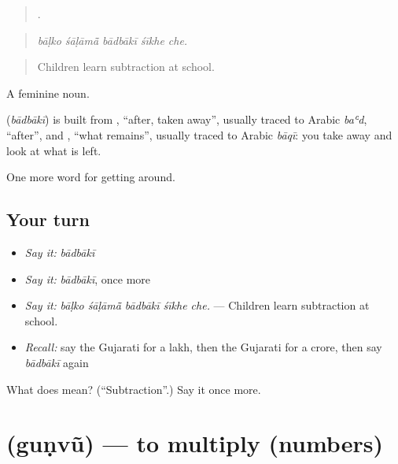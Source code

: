 \begin{quote}
    .
\end{quote}

\begin{quote}
\emph{bāḷko śāḷāmā̃ bādbākī śīkhe che.}
\end{quote}

\begin{quote}
Children learn subtraction at school.
\end{quote}

A feminine noun.

\begin{cousinweb}
\textbf{} (\emph{bādbākī}) is built from , \textquotedblleft{}after, taken away\textquotedblright{}, usually traced to Arabic \emph{baʿd}, \textquotedblleft{}after\textquotedblright{}, and , \textquotedblleft{}what remains\textquotedblright{}, usually traced to Arabic \emph{bāqī}: you take away and look at what is left.
\end{cousinweb}

\begin{grammarlens}[title={What you've built}]
One more word for getting around.
\end{grammarlens}

\subsection*{Your turn}
\begin{itemize}
\raggedright
  \item \emph{Say it:} \emph{bādbākī}
  \item \emph{Say it:} \emph{bādbākī}, once more
  \item \emph{Say it:} \emph{bāḷko śāḷāmā̃ bādbākī śīkhe che.} — Children learn subtraction at school.
  \item \emph{Recall:} say the Gujarati for a lakh, then the Gujarati for a crore, then say \emph{bādbākī} again
\end{itemize}

\begin{tcolorbox}[breakable,colback=teal!4,colframe=teal!35!black,title={Before you move on}]
What does  mean? (\textquotedblleft{}Subtraction\textquotedblright{}.) Say it once more.
\end{tcolorbox}
\section[\texorpdfstring{\gu{ગુણવું} (guṇvũ)}{ગુણવું (guṇvũ)}]{ (guṇvũ) — to multiply (numbers)}

